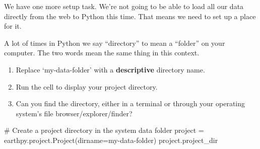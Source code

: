 \documentclass[
  letterpaper,
  DIV=11,
  numbers=noendperiod,
  oneside]{scrreprt}
\newenvironment{Shaded}{\begin{snugshade}}{\end{snugshade}}
\newcommand{\CommentTok}[1]{\textcolor[rgb]{0.37,0.37,0.37}{#1}}
\newcommand{\NormalTok}[1]{\textcolor[rgb]{0.00,0.23,0.31}{#1}}
\newcommand{\OperatorTok}[1]{\textcolor[rgb]{0.37,0.37,0.37}{#1}}
\newcommand{\StringTok}[1]{\textcolor[rgb]{0.13,0.47,0.30}{#1}}
\providecommand{\tightlist}{%
  \setlength{\itemsep}{0pt}\setlength{\parskip}{0pt}}
\begin{document}
We have one more setup task. We're not going to be able to load all our
data directly from the web to Python this time. That means we need to
set up a place for it.

\begin{tcolorbox}[enhanced jigsaw, colbacktitle=quarto-callout-caution-color!10!white, opacityback=0, bottomtitle=1mm, toptitle=1mm, bottomrule=.15mm, left=2mm, colframe=quarto-callout-caution-color-frame, leftrule=.75mm, opacitybacktitle=0.6, colback=white, rightrule=.15mm, toprule=.15mm, breakable, titlerule=0mm, title={GOTCHA ALERT!}, coltitle=black, arc=.35mm]

A lot of times in Python we say ``directory'' to mean a ``folder'' on
your computer. The two words mean the same thing in this context.

\end{tcolorbox}

\begin{tcolorbox}[enhanced jigsaw, colbacktitle=quarto-callout-color!10!white, opacityback=0, bottomtitle=1mm, toptitle=1mm, bottomrule=.15mm, left=2mm, colframe=quarto-callout-color-frame, leftrule=.75mm, opacitybacktitle=0.6, colback=white, rightrule=.15mm, toprule=.15mm, breakable, titlerule=0mm, title=\textcolor{quarto-callout-color}{\faInfo}\hspace{0.5em}{Try It}, coltitle=black, arc=.35mm]

\begin{enumerate}
\def\labelenumi{\arabic{enumi}.}
\tightlist
\item
  Replace `my-data-folder' with a \textbf{descriptive} directory name.
\item
  Run the cell to display your project directory.
\item
  Can you find the directory, either in a terminal or through your
  operating system's file browser/explorer/finder?
\end{enumerate}

\end{tcolorbox}

\begin{Shaded}
\begin{Highlighting}[]
\CommentTok{\# Create a project directory in the system data folder}
\NormalTok{project }\OperatorTok{=}\NormalTok{ earthpy.project.Project(dirname}\OperatorTok{=}\StringTok{\textquotesingle{}my{-}data{-}folder\textquotesingle{}}\NormalTok{)}
\NormalTok{project.project\_dir}
\end{Highlighting}
\end{Shaded}
\end{document}
